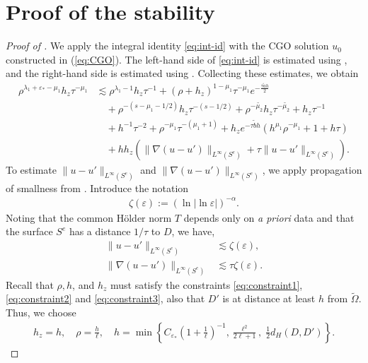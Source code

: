 ﻿\documentclass[11pt,reqno,oneside]{amsart}
\theoremstyle{definition}
\theoremstyle{remark}
\newcommand{\eqnref}[1]{(\ref {#1})}
\newcommand{\n}{\nabla}
\renewcommand{\a}{\alpha}
\newcommand{\e}{\varepsilon}
\newcommand{\lm}{\lambda}
\renewcommand{\O}{\Omega}
\begin{document}
        \section{Proof of the stability}\label{sec:proof}

        \begin{proof}[Proof of ]
            We apply the integral identity \eqref{eq:int-id} with the CGO solution $u_0$ constructed in \eqnref{eq:CGO}. The left-hand side of \eqref{eq:int-id} is estimated using , and the right-hand side is estimated using . Collecting these estimates, we obtain
            \begin{align*}
                \rho^{\lm_1+\e_*-\mu_1} h_z \tau^{-\mu_1} &\lesssim \rho^{\lm_1-1}h_z\tau^{-1} + (\rho+h_z)^{1-\mu_1}\tau^{-\mu_1} e^{-\frac{\tau \widetilde{a} h}{2}}\\
                & \quad + \rho^{-(s-\mu_1-1/2)}h_z \tau^{-(s-1/2)} + \rho^{-\widetilde{\mu_2}}h_z\tau^{-\widetilde{\mu_2}} + h_z\tau^{-1}\\
                & \quad + h^{-1}\tau^{-2}+\rho^{-\mu_1}\tau^{-(\mu_1+1)}+h_z e^{-\tau \widetilde{b} h} (h^{\mu_1}\rho^{-\mu_1}+1+h\tau)\\
                &\quad +h h_z \left(\|\n(u-u')\|_{L^\infty(S^e)}+\tau\|u-u'\|_{L^\infty(S^e)}\right).
            \end{align*}
            To estimate $\|u-u'\|_{L^\infty(S^e)}$ and $\|\n(u-u')\|_{L^\infty(S^e)}$, we apply propagation of smallness from . Introduce the notation
            \begin{align*}
                \zeta(\e):=(\ln |\ln \e|)^{-\a}.
            \end{align*}
            Noting that the common H\"older norm $T$ depends only on {\it a priori} data and that the surface $S^e$ has a distance $1/\tau$ to $D$, we have,
            \begin{align*}
                \|u-u'\|_{L^\infty(S^e)} &\lesssim \zeta(\e),\\
                \|\n(u-u')\|_{L^\infty(S^e)} &\lesssim \tau \zeta(\e).
            \end{align*}
            Recall that $\rho,h$, and $h_z$ must satisfy the constraints \eqref{eq:constraint1},\eqref{eq:constraint2} and \eqref{eq:constraint3}, also that $D'$ is at distance at least $h$ from $\widetilde{\O}$. Thus, we choose
            \begin{align*}
                h_z=h,\quad \rho=\frac{h}{\ell},\quad h=\min\left\lbrace C_{\e_*}\left(1+\frac{1}{\ell}\right)^{-1} ,\frac{\ell^2}{2\ell+1},\;\frac{1}{2}d_H(D,D')\right\rbrace.

\end{align*}
\end{proof}
\end{document}
